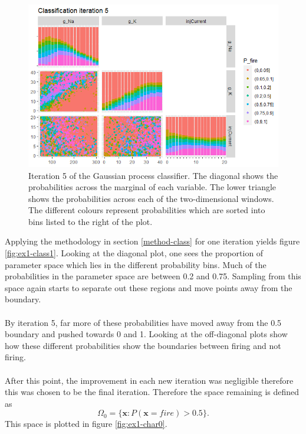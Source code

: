\documentclass{article}
\newcommand{\inputVec}{\mathbf{x}}
\newcommand{\NROYspace}{\Omega}
\begin{document}
\begin{figure}[t]
    \centering
    \includegraphics[width=\linewidth]{Example1/class5.png}
    \caption{Iteration 5 of the Gaussian process classifier. The diagonal shows the probabilities across the marginal of each variable. The lower triangle shows the probabilities across each of the two-dimensional windows. The different colours represent probabilities which are sorted into bins listed to the right of the plot.}
    \label{fig:ex1-class5}
\end{figure}
Applying the methodology in section \ref{method-class} for one iteration yields figure \ref{fig:ex1-class1}. Looking at the diagonal plot, one sees the proportion of parameter space which lies in the different probability bins. Much of the probabilities in the parameter space are between 0.2 and 0.75. Sampling from this space again starts to separate out these regions and move points away from the boundary.\\\\
By iteration 5, far more of these probabilities have moved away from the 0.5 boundary and pushed towards 0 and 1. Looking at the off-diagonal plots show how these different probabilities show the boundaries between firing and not firing.\\\\ After this point, the improvement in each new iteration was negligible therefore this was chosen to be the final iteration. Therefore the space remaining is defined as \[\NROYspace_0 = \{\inputVec:P(\inputVec=fire)>0.5 \}.\] This space is plotted in figure \ref{fig:ex1-char0}.
\end{document}
